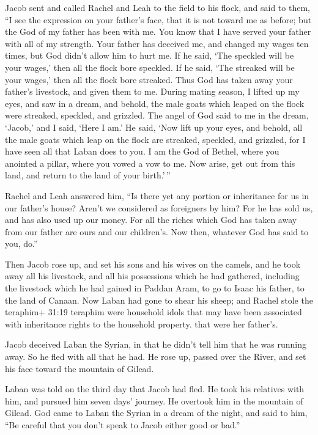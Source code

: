  Jacob sent and called Rachel and Leah to the field to his
flock,  and said to them, ``I see the expression on your
father's face, that it is not toward me as before; but the God of my
father has been with me.  You know that I have served your
father with all of my strength.  Your father has deceived
me, and changed my wages ten times, but God didn't allow him to hurt me.
 If he said, `The speckled will be your wages,' then all the
flock bore speckled. If he said, `The streaked will be your wages,' then
all the flock bore streaked.  Thus God has taken away your
father's livestock, and given them to me.  During mating
season, I lifted up my eyes, and saw in a dream, and behold, the male
goats which leaped on the flock were streaked, speckled, and grizzled.
 The angel of God said to me in the dream, `Jacob,' and I
said, `Here I am.'  He said, `Now lift up your eyes, and
behold, all the male goats which leap on the flock are streaked,
speckled, and grizzled, for I have seen all that Laban does to you.
 I am the God of Bethel, where you anointed a pillar, where
you vowed a vow to me. Now arise, get out from this land, and return to
the land of your birth.'\,''

 Rachel and Leah answered him, ``Is there yet any portion
or inheritance for us in our father's house?  Aren't we
considered as foreigners by him? For he has sold us, and has also used
up our money.  For all the riches which God has taken away
from our father are ours and our children's. Now then, whatever God has
said to you, do.''

 Then Jacob rose up, and set his sons and his wives on the
camels,  and he took away all his livestock, and all his
possessions which he had gathered, including the livestock which he had
gained in Paddan Aram, to go to Isaac his father, to the land of Canaan.
 Now Laban had gone to shear his sheep; and Rachel stole
the teraphim+ 31:19 teraphim were household idols that may have been
associated with inheritance rights to the household property. that were
her father's.

 Jacob deceived Laban the Syrian, in that he didn't tell
him that he was running away.  So he fled with all that he
had. He rose up, passed over the River, and set his face toward the
mountain of Gilead.

 Laban was told on the third day that Jacob had fled.
 He took his relatives with him, and pursued him seven
days' journey. He overtook him in the mountain of Gilead. 
God came to Laban the Syrian in a dream of the night, and said to him,
``Be careful that you don't speak to Jacob either good or bad.''

